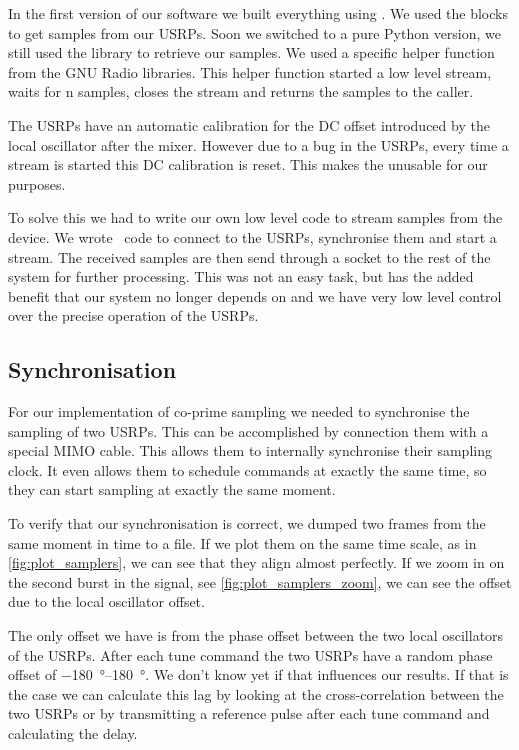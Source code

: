 \documentclass[a4paper, openany, oneside]{memoir}
\begin{document}
In the first version of our software we built everything using . We used the  blocks to get samples from our USRPs. Soon we switched to a pure Python version, we still used the  library to retrieve our samples. We used a specific helper function  from the GNU Radio libraries. This helper function started a low level stream, waits for n samples, closes the stream and returns the samples to the caller.

The USRPs have an automatic calibration for the DC offset introduced by the local oscillator after the mixer. However due to a bug in the USRPs, every time a stream is started this DC calibration is reset. This makes the  unusable for our purposes.

To solve this we had to write our own low level code to stream samples from the device. We wrote \CC~code to connect to the USRPs, synchronise them and start a stream. The received samples are then send through a socket to the rest of the system for further processing. This was not an easy task, but has the added benefit that our system no longer depends on  and we have very low level control over the precise operation of the USRPs.


\subsection{Synchronisation}
For our implementation of co-prime sampling we needed to synchronise the sampling of two USRPs. This can be accomplished by connection them with a special MIMO cable. This allows them to internally synchronise their sampling clock. It even allows them to schedule commands at exactly the same time, so they can start sampling at exactly the same moment.

To verify that our synchronisation is correct, we dumped two frames from the same moment in time to a file. If we plot them on the same time scale, as in \cref{fig:plot_samplers}, we can see that they align almost perfectly. If we zoom in on the second burst in the signal, see \cref{fig:plot_samplers_zoom}, we can see the offset due to the local oscillator offset.

The only offset we have is from the phase offset between the two local oscillators of the USRPs. After each tune command the two USRPs have a random phase offset of \SIrange[retain-explicit-plus]{-180}{+180}{\degree}.  We don't know yet if that influences our results. If that is the case we can calculate this lag by looking at the cross-correlation between the two USRPs or by transmitting a reference pulse after each tune command and calculating the delay.
\end{document}
